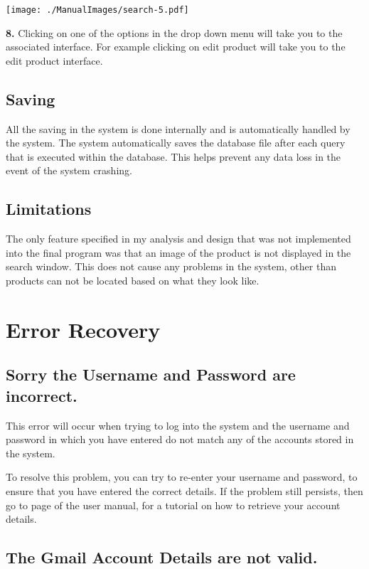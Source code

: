 \texttt{[image: ./ManualImages/search-5.pdf]}

\textbf{8.} Clicking on one of the options in the drop down menu will take you to the associated interface. For example clicking on edit product will take you to the edit product interface.


\subsection{Saving}

All the saving in the system is done internally and is automatically handled by the system. The system automatically saves the database file after each query that is executed within the database. This helps prevent any data loss in the event of the system crashing.

\subsection{Limitations}

The only feature specified in my analysis and design that was not implemented into the final program was that an image of the product is not displayed in the search window. This does not cause any problems in the system, other than products can not be located based on what they look like.

\section{Error Recovery}

\subsection{Sorry the Username and Password are incorrect.}

This error will occur when trying to log into the system and the username and password in which you have entered do not match any of the accounts stored in the system.

To resolve this problem, you can try to re-enter your username and password, to ensure that you have entered the correct details. If the problem still persists, then go to page \pageref{fig:Forgetting Your User-name or Password} of the user manual, for a tutorial on how to retrieve your account details.

\subsection{The Gmail Account Details are not valid.}

